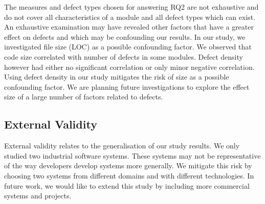 \documentclass[times]{smrauth}
\begin{document}
The measures and defect types chosen for answering RQ2 are not exhaustive and do not cover all characteristics of a module and all defect types which can exist. An exhaustive examination may
have revealed other factors that have a greater effect on  defects and which may be confounding our results. In our study, we investigated file size (LOC) as a possible confounding factor. We observed that code size correlated with number of  defects in some modules. Defect density however had either no significant correlation or only minor negative correlation. Using defect density in our study mitigates the risk of size as a possible confounding factor. We are planning future investigations to explore the effect size of a large number of factors related to defects.

%



\subsection{External Validity}

External validity relates to the generalisation of our study results. We only studied two industrial software systems. These systems may not be representative of the way developers develop systems more generally. We mitigate this risk by choosing two systems from different domains and with different technologies. In future work, we would like to extend this study by including more commercial systems and projects. 

%
\end{document}
